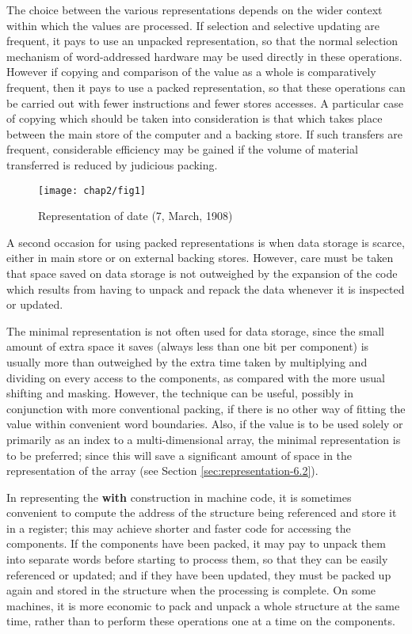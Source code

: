 The choice between the various representations depends on the wider context within which the values are processed. If selection and selective updating are frequent, it pays to use an unpacked representation, so that the normal selection mechanism of word-addressed hardware may be used directly in these operations. However if copying and comparison of the value as a whole is comparatively frequent, then it pays to use a packed representation, so that these operations can be carried out with fewer instructions and fewer stores accesses. A particular case of copying which should be taken into consideration is that which takes place between the main store of the computer and a backing store. If such transfers are frequent, considerable efficiency may be gained if the volume of material transferred is reduced by judicious packing.

\begin{figure}[h]
	\centering
	\texttt{[image: chap2/fig1]}
	\caption{Representation of date (7, March, 1908)}
\end{figure}

A second occasion for using packed representations is when data storage is scarce, either in main store or on external backing stores. However, care must be taken that space saved on data storage is not outweighed by the expansion of the code which results from having to unpack and repack the data whenever it is inspected or updated.

The minimal representation is not often used for data storage, since the small amount of extra space it saves (always less than one bit per component) is usually more than outweighed by the extra time taken by multiplying and dividing on every access to the components, as compared with the more usual shifting and masking. However, the technique can be useful, possibly in conjunction with more conventional packing, if there is no other way of fitting the value within convenient word boundaries. Also, if the value is to be used solely or primarily as an index to a multi-dimensional array, the minimal representation is to be preferred; since this will save a significant amount of space in the representation of the array (see Section \ref{sec:representation-6.2}).

In representing the \textbf{with} construction in machine code, it is sometimes convenient to compute the address of the structure being referenced and store it in a register; this may achieve shorter and faster code for accessing the components. If the components have been packed, it may pay to unpack them into separate words before starting to process them, so that they can be easily referenced or updated; and if they have been updated, they must be packed up again and stored in the structure when the processing is complete. On some machines, it is more economic to pack and unpack a whole structure at the same time, rather than to perform these operations one at a time on the components.

